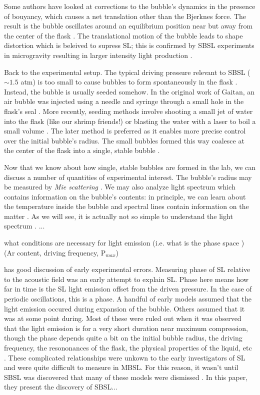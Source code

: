 \documentclass[rmp,aps,nofootinbib,superscriptaddress,floatfix]{revtex4-2}
\begin{document}
Some authors have looked at corrections to the bubble's dynamics in the presence of bouyancy, which causes a net translation other than the Bjerknes force. The result is the bubble oscillates around an equilibrium position near but away from the center of the flask \cite{matula2000single,matula1997bjerknes,matula1999inertial}. The translational motion of the bubble leads to shape distortion which is beleived to supress SL; this is confirmed by SBSL experiments in microgravity resulting in larger intensity light production \cite{matula2000single}.

Back to the experimental setup. The typical driving pressure relevant to SBSL ($\sim 1.5$ atm) is too small to cause bubbles to form spontaneously in the flask \cite{}. Instead, the bubble is usually seeded somehow. In the original work of Gaitan, an air bubble was injected using a needle and syringe through a small hole in the flask's seal \cite{gaitan1992sonoluminescence}. More recently, seeding methods involve shooting a small jet of water into the flask (like our shrimp friends!) or blasting the water with a laser to boil a small volume \cite{}. The later method is preferred as it enables more precise control over the initial bubble's radius. The small bubbles formed this way coalesce at the center of the flask into a single, stable bubble \cite{}.

Now that we know about how single, stable bubbles are formed in the lab, we can discuss a number of quantities of experimental interest. The bubble's radius may be measured by \emph{Mie scattering} \cite{}. We may also analyze light spectrum which contains information on the bubble's contents: in principle, we can learn about the temperature inside the bubble and spectral lines contain information on the matter \cite{}. As we will see, it is actually not so simple to understand the light spectrum \cite{}. ...

{\color{red} what conditions are necessary for light emission (i.e. what is the phase space \cite{lohse2018bubble}) (Ar content, driving frequency, P$_{max}$)


\cite{gaitan1992sonoluminescence} has good discussion of early experimental errors. Measuring phase of SL relative to the acoustic field was an early attempt to explain SL. Phase here means how far in time is the SL light emission offset from the driven pressure. In the case of periodic oscillations, this is a phase. A handful of early models assumed that the light emission occured during expansion of the bubble. Others assumed that it was at some point during. Most of these were ruled out when it was observed that the light emission is for a very short duration near maximum compression, though the phase depends quite a bit on the initial bubble radius, the driving frequency, the resononances of the flask, the physical properties of the liquid, etc \cite{brenner2002single,gaitan1992sonoluminescence}. These complicated relationships were unkown to the early investigators of SL and were quite difficult to measure in MBSL. For this reason, it wasn't until SBSL was discovered that many of these models were dismissed \cite{gaitan1992sonoluminescence}. In this paper, they present the discovery of SBSL... }
\end{document}
